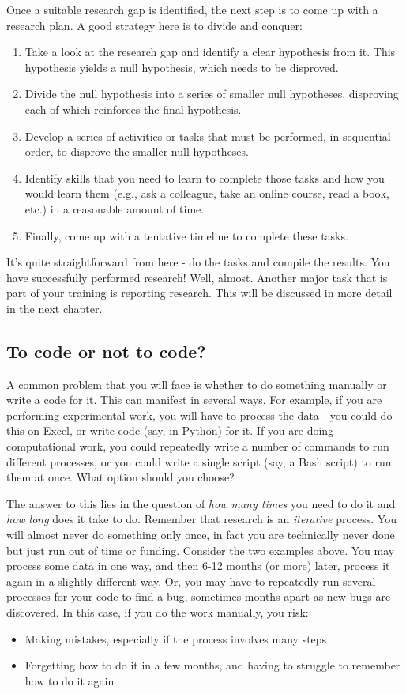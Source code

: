 \documentclass[12pt]{article}
\begin{document}
Once a suitable research gap is identified, the next step is to come up with a research plan. A good strategy here is to divide and conquer:

\begin{enumerate}
	\item Take a look at the research gap and identify a clear hypothesis from it. This hypothesis yields a null hypothesis, which needs to be disproved.
	\item Divide the null hypothesis into a series of smaller null hypotheses, disproving each of which reinforces the final hypothesis.
	\item Develop a series of activities or tasks that must be performed, in sequential order, to disprove the smaller null hypotheses. 
	\item Identify skills that you need to learn to complete those tasks and how you would learn them (e.g., ask a colleague, take an online course, read a book, etc.) in a reasonable amount of time.
	\item Finally, come up with a tentative timeline to complete these tasks.
\end{enumerate}

It's quite straightforward from here - do the tasks and compile the results. You have successfully performed research! Well, almost. Another major task that is part of your training is reporting research. This will be discussed in more detail in the next chapter.

\subsection{To code or not to code?}
A common problem that you will face is whether to do something manually or write a code for it. This can manifest in several ways. For example, if you are performing experimental work, you will have to process the data - you could do this on Excel, or write code (say, in Python) for it. If you are doing computational work, you could repeatedly write a number of commands to run different processes, or you could write a single script (say, a Bash script) to run them at once. What option should you choose?

The answer to this lies in the question of \textit{how many times} you need to do it and \textit{how long} does it take to do. Remember that research is an \textit{iterative} process. You will almost never do something only once, in fact you are technically never done but just run out of time or funding. Consider the two examples above. You may process some data in one way, and then 6-12 months (or more) later, process it again in a slightly different way. Or, you may have to repeatedly run several processes for your code to find a bug, sometimes months apart as new bugs are discovered. In this case, if you do the work manually, you risk:
\begin{itemize}
	\item Making mistakes, especially if the process involves many steps
	\item Forgetting how to do it in a few months, and having to struggle to remember how to do it again
\end{itemize}
\end{document}
